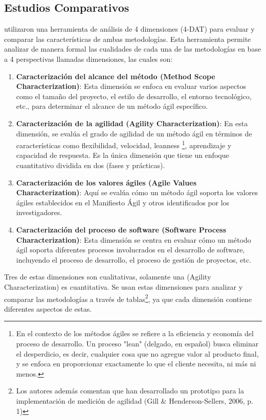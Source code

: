 \documentclass[a4paper,10pt]{article}
\begin{document}
	\subsection{Estudios Comparativos}
	\textcite{Gill_Henderson-Sellers_2006} utilizaron una herramienta de análisis de 4 dimensiones (4-DAT) para evaluar y comparar las características de ambas metodologías. Esta herramienta permite analizar de manera formal las cualidades de cada una de las metodologías en base a 4 perspectivas llamadas dimensiones, las cuales son:
	\begin{enumerate}
		\item \textbf{Caracterización del alcance del método (Method Scope Characterization)}: Esta dimensión se enfoca en evaluar varios aspectos como el tamaño del proyecto, el estilo de desarrollo, el entorno tecnológico, etc., para determinar el alcance de un método ágil específico.
		\item \textbf{Caracterización de la agilidad (Agility Characterization)}: En esta dimensión, se evalúa el grado de agilidad de un método ágil en términos de características como flexibilidad, velocidad, leanness \footnote{En el contexto de los métodos ágiles se refiere a la eficiencia y economía del proceso de desarrollo. Un proceso "lean" (delgado, en español) busca eliminar el desperdicio, es decir, cualquier cosa que no agregue valor al producto final, y se enfoca en proporcionar exactamente lo que el cliente necesita, ni más ni menos.}, aprendizaje y capacidad de respuesta. Es la única dimensión que tiene un enfoque cuantitativo dividida en dos (fases y prácticas).
		\item \textbf{Caracterización de los valores ágiles (Agile Values Characterization)}: Aquí se evalúa cómo un método ágil soporta los valores ágiles establecidos en el Manifiesto Ágil y otros identificados por los investigadores.
		\item \textbf{Caracterización del proceso de software (Software Process Characterization)}: Esta dimensión se centra en evaluar cómo un método ágil soporta diferentes procesos involucrados en el desarrollo de software, incluyendo el proceso de desarrollo, el proceso de gestión de proyectos, etc.
	\end{enumerate}
	Tres de estas dimensiones son cualitativas, solamente una (Agility Characterization) es cuantitativa. Se usan estas dimensiones para analizar y comparar las metodologías a través de tablas\footnote{Los autores además comentan que han desarrollado un prototipo para la implementación de medición de agilidad (Gill \& Henderson-Sellers, 2006, p. 1)}, ya que cada dimensión contiene diferentes aspectos de estas.
	
\end{document}
